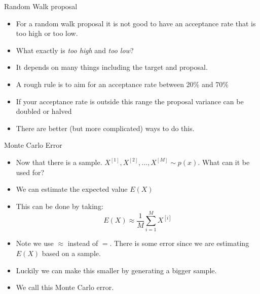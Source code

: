 \documentclass[10pt]{beamer}
\begin{document}
\begin{frame}{Random Walk proposal}
\begin{itemize}
\item For a random walk proposal it is not good to have an acceptance rate that is too high or too low.

\item What exactly is {\em too high} and {\em too low}?

\item It depends on many things including the target and proposal.

\item A rough rule is to aim for an acceptance rate between 20\% and 70\%

\item If your acceptance rate is outside this range the proposal variance can be doubled or halved

\item There are better (but more complicated) ways to do this.
\end{itemize}
\end{frame}
\begin{frame}{Monte Carlo Error}
\begin{itemize}
\item Now that there is a sample. $X^{[1]},X^{[2]},\ldots,X^{[M]}\sim p(x)$. What can it be used for?

\item We can estimate the expected value $E(X)$

\item This can be done by taking:
\begin{equation*}
E(X)\approx \frac{1}{M}\sum_{i=1}^M X^{[i]}
\end{equation*}

\item Note we use $\approx$ instead of $=$.  There is some error since we are estimating $E(X)$ based on a sample.

\item Luckily we can make this smaller by generating a bigger sample.

\item We call this Monte Carlo error.
\end{itemize}
\end{frame}
\end{document}
